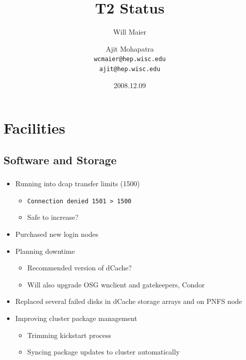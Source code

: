 \documentclass{beamer}
\title{T2 Status}
\author[Maier, Mohapatra]{
    Will Maier \and Ajit Mohapatra\\ 
    {\tt wcmaier@hep.wisc.edu}\\
    {\tt ajit@hep.wisc.edu}}
\institute[Wisconsin]{University of Wisconsin - High Energy Physics}
\date{2008.12.09}
\begin{document}
\begin{frame}
    \titlepage
\end{frame}


\section{Facilities}
\subsection{Software and Storage}
\begin{frame}
\frametitle{}
\begin{itemize}
    \item Running into dcap transfer limits (1500)
    \begin{itemize}
        \item {\tt Connection denied 1501 > 1500}
        \item Safe to increase?
    \end{itemize}
    \item Purchased new login nodes
    \item Planning downtime
    \begin{itemize}
        \item Recommended version of dCache?
        \item Will also upgrade OSG wnclient and gatekeepers, Condor
    \end{itemize}
    \item Replaced several failed disks in dCache storage arrays and on PNFS node
    \item Improving cluster package management
    \begin{itemize}
        \item Trimming kickstart process
        \item Syncing package updates to cluster automatically
    \end{itemize}
\end{itemize}
\end{frame}
\end{document}
